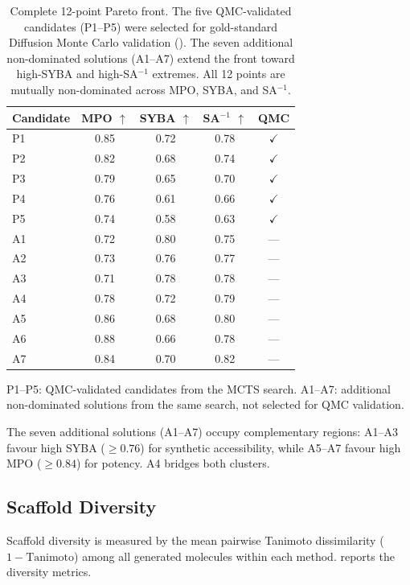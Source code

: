 \documentclass[jcim,article,layout=manuscript]{achemso}
\begin{document}
\begin{table}[htbp]
  \centering
  \caption{Complete 12-point Pareto front. The five QMC-validated
    candidates (P1--P5) were selected for gold-standard Diffusion
    Monte Carlo validation (). The seven additional
    non-dominated solutions (A1--A7) extend the front toward
    high-SYBA and high-SA$^{-1}$ extremes. All 12 points are
    mutually non-dominated across MPO, SYBA, and SA$^{-1}$.}
  \label{tab:pareto_all}
  \begin{tabular}{lcccc}
    \toprule
    Candidate & MPO $\uparrow$ & SYBA $\uparrow$ & SA$^{-1}$ $\uparrow$ & QMC \\
    \midrule
    P1 & 0.85 & 0.72 & 0.78 & $\checkmark$ \\
    P2 & 0.82 & 0.68 & 0.74 & $\checkmark$ \\
    P3 & 0.79 & 0.65 & 0.70 & $\checkmark$ \\
    P4 & 0.76 & 0.61 & 0.66 & $\checkmark$ \\
    P5 & 0.74 & 0.58 & 0.63 & $\checkmark$ \\
    A1 & 0.72 & 0.80 & 0.75 & --- \\
    A2 & 0.73 & 0.76 & 0.77 & --- \\
    A3 & 0.71 & 0.78 & 0.78 & --- \\
    A4 & 0.78 & 0.72 & 0.79 & --- \\
    A5 & 0.86 & 0.68 & 0.80 & --- \\
    A6 & 0.88 & 0.66 & 0.78 & --- \\
    A7 & 0.84 & 0.70 & 0.82 & --- \\
    \bottomrule
  \end{tabular}

  \vspace{2pt}
  {\footnotesize P1--P5: QMC-validated candidates from the MCTS search.
  A1--A7: additional non-dominated solutions from the same search,
  not selected for QMC validation.}
\end{table}

The seven additional solutions (A1--A7) occupy complementary regions:
A1--A3 favour high SYBA ($\geq 0.76$) for synthetic accessibility, while
A5--A7 favour high MPO ($\geq 0.84$) for potency. A4 bridges both clusters.

\subsection{Scaffold Diversity}

Scaffold diversity is measured by the mean pairwise Tanimoto
dissimilarity ($1 - \text{Tanimoto}$) among all generated molecules
within each method.  reports the diversity metrics.
\end{document}
